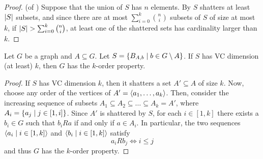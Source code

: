 \begin{lemma}
        \begin{proof} (of )
            Suppose that the union of $S$ has $n$ elements.
            By  $S$ shatters at least $\left| S \right|$ subsets, and since there are at most
            $\sum_{i=0}^k \binom{n}{i}$ subsets of $S$ of size at most $k$, if
            $\left| S \right| > \sum_{i=0}^k \binom{n}{i}$, at least one of the shattered sets has cardinality larger than $k$.
        \end{proof}
    \end{lemma}

    \begin{lemma} \label{lem:vc_dimension_implies_k_order_property}
        Let $G$ be a graph and $A \subseteq G$.
        Let $S = \left\{ B_{A,b} \mid b \in G \setminus A \right\}$.
        If $S$ has VC dimension (at least) $k$, then $G$ has the $k$-order property.
        \begin{proof}
            If $S$ has VC dimension $k$, then it shatters a set $A' \subseteq A$ of size $k$.
            Now, choose any order of the vertices of $A' = \left< a_1, \dots, a_k \right>$.
            Then, consider the increasing sequence of subsets $A_1 \subseteq A_2 \subseteq \dots \subseteq A_k = A'$,
            where $A_i = \left\{ a_j \mid j \in [1,i] \right\}$.
            Since $A'$ is shattered by $S$, for each $i \in [1,k]$ there exists a $b_i \in G$ such that
            $b_i R a$ if and only if $a \in A_i$.
            In particular, the two sequences $\left< a_i \mid i \in [1,k] \right>$ and $\left< b_i \mid i \in [1,k] \right>$
            satisfy
            \[
                a_i R b_j \Leftrightarrow i \leq j
            \]
            and thus $G$ has the $k$-order property.
        \end{proof}
    \end{lemma}

